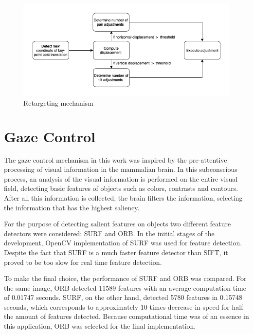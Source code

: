 \documentclass{l4proj}
\begin{document}
\begin{figure}[ht]
    \centering
    \includegraphics[width=1\textwidth]{l4template-master/images/retargeting2.png}
    \caption{Retargeting mechanism}
    \label{retargeting}
\end{figure}

\section{Gaze Control}



The gaze control mechanism in this work was inspired by the pre-attentive processing of visual information in the mammalian brain. In this subconscious process, an analysis of the visual information is performed on the entire visual field, detecting basic features of objects such as colors, contrasts and contours. After all this information is collected, the brain filters the information, selecting the information that has the highest saliency. 



For the purpose of detecting salient features on objects two different feature detectors were considered: SURF and ORB. In the initial stages of the development, OpenCV implementation of SURF was used for feature detection. Despite the fact that SURF is a much faster feature detector than SIFT, it proved to be too slow for real time feature detection. 

To make the final choice, the performance of SURF and ORB was compared. For the same image, ORB detected 11589 features with an average computation time of 0.01747 seconds. SURF, on the other hand, detected 5780 features in 0.15748 seconds, which corresponds to approximately 10 times decrease in speed for half the amount of features detected. Because computational time was of an essence in this application, ORB was selected for the final implementation. 
\end{document}
